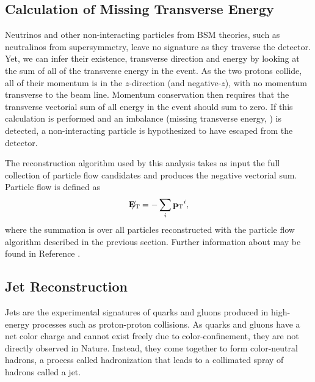 \subsection{Calculation of Missing Transverse Energy}
\label {sec:cms_met}
Neutrinos and other non-interacting particles from BSM theories, such
as neutralinos from supersymmetry, leave no signature as they traverse
the detector. Yet, we can infer their existence, transverse direction and
energy by looking at the sum of all of the transverse energy in the event.
As the two protons collide, all of their momentum is in the $z$-direction
(and negative-$z$), with no momentum transverse to the beam line. Momentum
conservation then requires that the transverse vectorial sum of all energy in
the event should sum to zero. If this calculation is performed and an imbalance
(missing transverse energy, \met) is detected, a non-interacting particle is
hypothesized to have escaped from the detector.

The \met reconstruction algorithm used by this analysis takes as input the full
collection of particle flow candidates and produces the negative vectorial sum.
Particle flow \met is defined as
\[
{\bf E_{\mathrm{T}}\hspace{-1.0em}/\kern0.45em} =  - \displaystyle\sum_{i} {\bf p_{\mathrm{T}}}^{i},
\]
where the summation is over all particles reconstructed with the particle
flow algorithm described in the previous section. Further information about
\met may be found in Reference \cite{metPerformance}.

\subsection{Jet Reconstruction}
\label {sec:cms_jets}
Jets are the experimental signatures of quarks and gluons produced in
high-energy processes such as proton-proton collisions. As quarks
and gluons have a net color charge and cannot exist freely due to
color-confinement, they are not directly observed in Nature. Instead, they
come together to form color-neutral hadrons, a process called hadronization
that leads to a collimated spray of hadrons called a jet.

